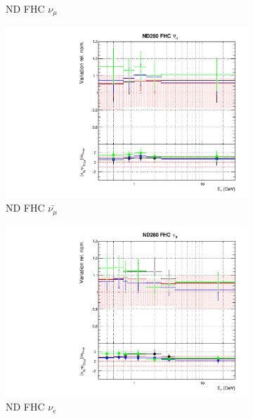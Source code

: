 \begin{figure}[!ht]
\begin{subfigure}{0.49\textwidth}
  \caption{ND FHC $\nu_{\mu}$}
\end{subfigure}
\begin{subfigure}{0.49\textwidth}
  \centering
  \includegraphics[width=0.99\linewidth]{figs/detcovbinflux_1}
  \caption{ND FHC $\bar{\nu_{\mu}}$}
\end{subfigure}
\begin{subfigure}{0.49\textwidth}
  \centering
  \includegraphics[width=0.99\linewidth]{figs/detcovbinflux_2}
  \caption{ND FHC $\nu_e$}
\end{subfigure}
\begin{subfigure}{0.49\textwidth}
  \centering

\end{subfigure}
\end{figure}
